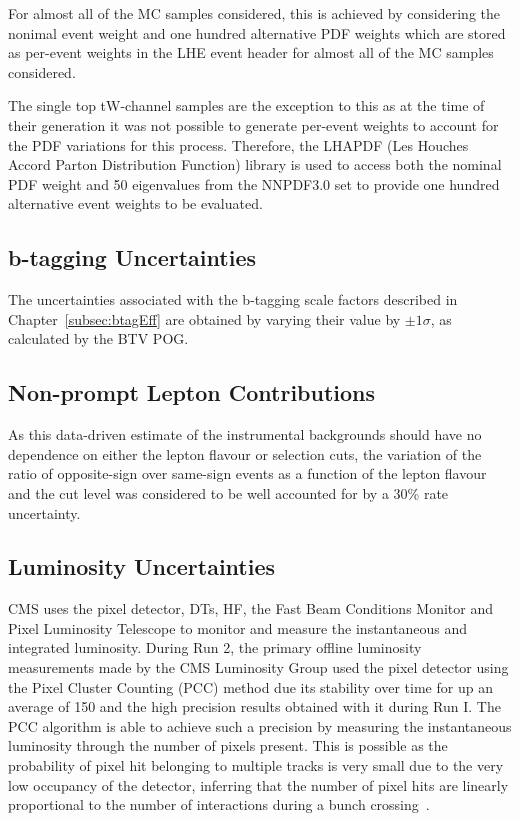 For almost all of the MC samples considered, this is achieved by considering the nonimal event weight and one hundred alternative PDF weights which are stored as per-event weights in the LHE 
event header for almost all of the MC samples considered.

The single top tW-channel samples are the exception to this as at the time of their generation it was not possible to generate per-event weights to account for the PDF variations for this process.
Therefore, the LHAPDF (Les Houches Accord Parton Distribution Function) library is used to access both the nominal PDF weight and 50 eigenvalues from the NNPDF3.0 set to provide one hundred alternative event weights to be evaluated.

\subsection{b-tagging Uncertainties}
The uncertainties associated with the b-tagging scale factors described in Chapter~\ref{subsec:btagEff} are obtained by varying their value by $\pm 1\sigma$, as calculated by the BTV POG.

\subsection{Non-prompt Lepton Contributions}
As this data-driven estimate of the instrumental backgrounds should have no dependence on either the lepton flavour or selection cuts, the variation of the ratio of opposite-sign over same-sign events as a function of the lepton flavour and the cut level was considered to be well accounted for by a 30\% rate uncertainty.

\subsection{Luminosity Uncertainties}
CMS uses the pixel detector, DTs, HF, the Fast Beam Conditions Monitor and Pixel Luminosity Telescope to monitor and measure the instantaneous and integrated luminosity.
During Run 2, the primary offline luminosity measurements made by the CMS Luminosity Group used the pixel detector using the Pixel Cluster Counting (PCC) method due its stability over time for up an average \PU of 150 and the high precision results obtained with it during Run I.
The PCC algorithm is able to achieve such a precision by measuring the instantaneous luminosity through the number of pixels present. 
This is possible as the probability of pixel hit belonging to multiple tracks is very small due to the very low occupancy of the detector, inferring that the number of pixel hits are linearly proportional to the number of interactions during a bunch crossing~\cite{CMS:2017_lumi}.

